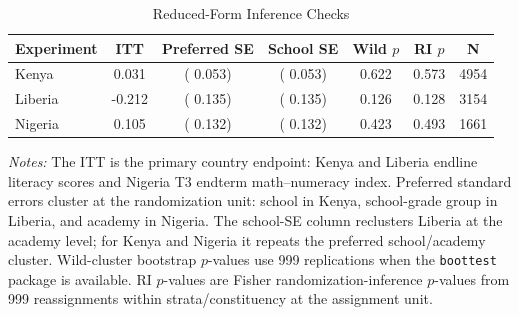 \begin{table}[H]
\centering
\caption{Reduced-Form Inference Checks}
\label{tab:rnr_inference_checks}
\begin{threeparttable}
\small
\begin{tabular}[t]{lcccccc}
\toprule
Experiment & ITT & Preferred SE & School SE & Wild $p$ & RI $p$ & N \\
\midrule
Kenya &  0.031 & ( 0.053) & ( 0.053) &  0.622 &  0.573 & 4954 \\
Liberia & -0.212 & ( 0.135) & ( 0.135) &  0.126 &  0.128 & 3154 \\
Nigeria &  0.105 & ( 0.132) & ( 0.132) &  0.423 &  0.493 & 1661 \\
\bottomrule
\end{tabular}
\begin{tablenotes}
\footnotesize
\item \textit{Notes:} The ITT is the primary country endpoint: Kenya and Liberia endline literacy scores and Nigeria T3 endterm math--numeracy index. Preferred standard errors cluster at the randomization unit: school in Kenya, school-grade group in Liberia, and academy in Nigeria. The school-SE column reclusters Liberia at the academy level; for Kenya and Nigeria it repeats the preferred school/academy cluster. Wild-cluster bootstrap $p$-values use 999 replications when the \texttt{boottest} package is available. RI $p$-values are Fisher randomization-inference $p$-values from 999 reassignments within strata/constituency at the assignment unit.
\end{tablenotes}
\end{threeparttable}
\end{table}
